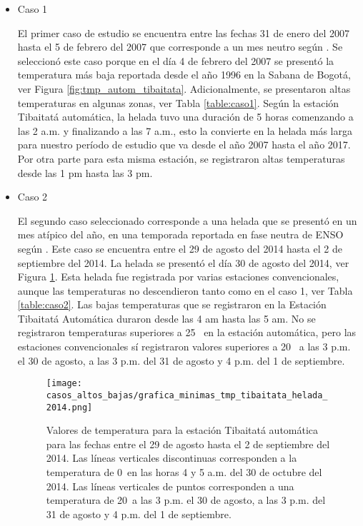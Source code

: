 \begin{itemize}
\item{Caso 1}%

El primer caso de estudio se encuentra entre las fechas 31 de enero del 2007 hasta el 5 de febrero del 2007 que corresponde a un mes neutro según \citet{NOAA-ORI}. Se seleccionó este caso porque en el día 4 de febrero del 2007 se presentó la temperatura más baja reportada desde el año 1996 en la Sabana de Bogotá, ver Figura   \ref{fig:tmp_autom_tibaitata}. Adicionalmente, se presentaron altas temperaturas en algunas zonas,  ver Tabla \ref{table:caso1}. Según la estación Tibaitatá automática, la helada tuvo una duración de 5 horas comenzando a las 2 a.m. y finalizando a las 7 a.m., esto la convierte en la helada más larga para nuestro período de estudio que va desde el año 2007 hasta el año 2017. Por otra parte para esta misma estación, se registraron altas temperaturas desde las 1 pm hasta las 3 pm.

\item{Caso 2}%

El segundo caso seleccionado corresponde a una helada que se presentó en un mes atípico del año, en una temporada reportada en fase neutra de ENSO según \citet{NOAA-ORI}. Este caso se encuentra entre el 29 de agosto del 2014 hasta el 2 de septiembre del 2014. La helada se presentó el día 30 de agosto del 2014, ver Figura \ref{fig:tmp_autom_tibaitata_2014}. Esta helada fue registrada por varias estaciones convencionales, aunque las temperaturas no descendieron tanto como en el caso 1, ver Tabla \ref{table:caso2}.  Las bajas temperaturas que se registraron en la Estación Tibaitatá Automática duraron desde las 4 am hasta las 5 am. No se registraron temperaturas superiores a 25 \celc\ en la estación automática, pero las estaciones convencionales sí registraron valores superiores a 20 \celsius\ a las 3 p.m. el 30 de agosto, a las 3 p.m. del 31 de agosto y 4 p.m. del 1 de septiembre.

\begin{figure}[H]
    \centering
    \caption{Valores de temperatura para la estación Tibaitatá automática para las fechas entre el 29 de agosto hasta el 2 de septiembre del 2014. Las líneas verticales discontinuas corresponden a la temperatura de 0\celc\ en las horas 4 y 5 a.m. del 30 de octubre del 2014. Las líneas verticales de puntos corresponden a una temperatura de 20\celc\ a las 3 p.m. el 30 de agosto, a las 3 p.m. del 31 de agosto y 4 p.m. del 1 de septiembre.}
    \texttt{[image: casos\_altos\_bajas/grafica\_minimas\_tmp\_tibaitata\_helada\_2014.png]}
    \label{fig:tmp_autom_tibaitata_2014}
\end{figure}



\end{itemize}
